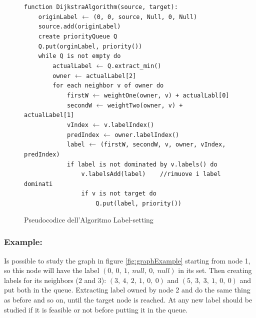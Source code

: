 \documentclass[a4paper,11pt]{report}
\begin{document}
\begin{figure}[h]
	\verb|function DijkstraAlgorithm(source, target):|\\
	\verb|    originLabel| $\leftarrow$ \verb|(0, 0, source, Null, 0, Null)|\\
	\verb|    source.add(originLabel)|\\
	\verb|    create priorityQueue Q|\\
	\verb|    Q.put(orginLabel, priority())|\\
	\verb|    while Q is not empty do|\\
	\verb|        actualLabel| $\leftarrow$ \verb|Q.extract_min()|\\
	\verb|        owner| $\leftarrow$ \verb|actualLabel[2]|\\
	\verb|        for each neighbor v of owner do|\\
	\verb|            firstW| $\leftarrow$ \verb|weightOne(owner, v) + actualLabl[0]|\\
	\verb|            secondW| $\leftarrow$ \verb|weightTwo(owner, v) + actualLabel[1]|\\
	\verb|            vIndex| $\leftarrow$ \verb|v.labelIndex()|\\
	\verb|            predIndex| $\leftarrow$ \verb|owner.labelIndex()|\\
	\verb|            label| $\leftarrow$ \verb|(firstW, secondW, v, owner, vIndex, predIndex)|\\
	\verb|            if label is not dominated by v.labels() do			|	\\
	\verb|                v.labelsAdd(label)    //rimuove i label dominati|\\
	\verb|                if v is not target do|\\
	\verb|                    Q.put(label, priority())|\\
	\caption{Pseudocodice dell'Algoritmo Label-setting}
	\label{fig:LabelSetting}
\end{figure}

\subsubsection*{Example:}
Is possible to study the graph in figure \ref{fig:graphExample} starting from node 1, so this node will have the label $(0,\ 0,\ 1,\ null,\ 0,\ null)$ in its set. Then creating labels for its neighbors (2 and 3): $(3,\ 4,\ 2,\ 1,\ 0,\ 0)$ and $(5,\ 3,\ 3,\ 1,\ 0,\ 0)$ and put both in the queue. Extracting label owned by node 2 and do the same thing as before and so on, until the target node is reached. At any new label should be studied if it is feasible or not before putting it in the queue.
\end{document}
